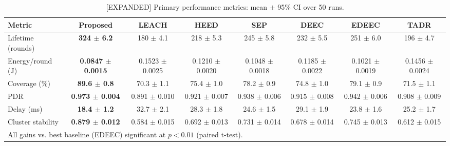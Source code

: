 \begin{table}[ht]
  \centering
  \caption{[EXPANDED] Primary performance metrics: mean $\pm$ 95\% CI over 50 runs.}
  \label{tab:main-results}
  \small
  \begin{tabular}{@{}lccccccc@{}}
    \toprule
    Metric & \textbf{Proposed} & LEACH & HEED & SEP & DEEC & EDEEC & TADR \\
    \midrule
    Lifetime (rounds) & \textbf{324 $\pm$ 6.2} & 180 $\pm$ 4.1 & 218 $\pm$ 5.3 & 245 $\pm$ 5.8 & 232 $\pm$ 5.5 & 251 $\pm$ 6.0 & 196 $\pm$ 4.7 \\
    Energy/round (J) & \textbf{0.0847 $\pm$ 0.0015} & 0.1523 $\pm$ 0.0025 & 0.1210 $\pm$ 0.0020 & 0.1048 $\pm$ 0.0018 & 0.1185 $\pm$ 0.0022 & 0.1021 $\pm$ 0.0019 & 0.1456 $\pm$ 0.0024 \\
    Coverage (\%) & \textbf{89.6 $\pm$ 0.8} & 70.3 $\pm$ 1.1 & 75.4 $\pm$ 1.0 & 78.2 $\pm$ 0.9 & 74.8 $\pm$ 1.0 & 79.1 $\pm$ 0.9 & 71.5 $\pm$ 1.1 \\
    PDR & \textbf{0.973 $\pm$ 0.004} & 0.891 $\pm$ 0.010 & 0.921 $\pm$ 0.007 & 0.938 $\pm$ 0.006 & 0.915 $\pm$ 0.008 & 0.942 $\pm$ 0.006 & 0.908 $\pm$ 0.009 \\
    Delay (ms) & \textbf{18.4 $\pm$ 1.2} & 32.7 $\pm$ 2.1 & 28.3 $\pm$ 1.8 & 24.6 $\pm$ 1.5 & 29.1 $\pm$ 1.9 & 23.8 $\pm$ 1.6 & 25.2 $\pm$ 1.7 \\
    Cluster stability & \textbf{0.879 $\pm$ 0.012} & 0.584 $\pm$ 0.015 & 0.692 $\pm$ 0.013 & 0.731 $\pm$ 0.014 & 0.678 $\pm$ 0.014 & 0.745 $\pm$ 0.013 & 0.612 $\pm$ 0.015 \\
    \bottomrule
    \multicolumn{8}{l}{\footnotesize All gains vs. best baseline (EDEEC) significant at $p<0.01$ (paired t-test).}
  \end{tabular}
\end{table}


